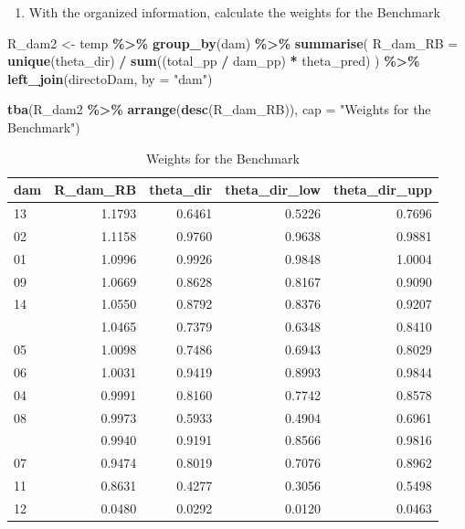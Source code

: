 \documentclass[
  12pt,
]{book}
\newenvironment{Shaded}{\begin{snugshade}}{\end{snugshade}}
\newcommand{\AttributeTok}[1]{\textcolor[rgb]{0.13,0.29,0.53}{#1}}
\newcommand{\FunctionTok}[1]{\textcolor[rgb]{0.13,0.29,0.53}{\textbf{#1}}}
\newcommand{\NormalTok}[1]{#1}
\newcommand{\OtherTok}[1]{\textcolor[rgb]{0.56,0.35,0.01}{#1}}
\newcommand{\SpecialCharTok}[1]{\textcolor[rgb]{0.81,0.36,0.00}{\textbf{#1}}}
\newcommand{\StringTok}[1]{\textcolor[rgb]{0.31,0.60,0.02}{#1}}
\providecommand{\tightlist}{%
  \setlength{\itemsep}{0pt}\setlength{\parskip}{0pt}}
\begin{document}
\begin{enumerate}
\def\labelenumi{\arabic{enumi}.}
\setcounter{enumi}{3}
\tightlist
\item
  With the organized information, calculate the weights for the Benchmark
\end{enumerate}

\begin{Shaded}
\begin{Highlighting}[]
\NormalTok{R\_dam2 }\OtherTok{\textless{}{-}}\NormalTok{ temp }\SpecialCharTok{\%\textgreater{}\%} \FunctionTok{group\_by}\NormalTok{(dam) }\SpecialCharTok{\%\textgreater{}\%} 
  \FunctionTok{summarise}\NormalTok{(}
  \AttributeTok{R\_dam\_RB =} \FunctionTok{unique}\NormalTok{(theta\_dir) }\SpecialCharTok{/} \FunctionTok{sum}\NormalTok{((total\_pp  }\SpecialCharTok{/}\NormalTok{ dam\_pp) }\SpecialCharTok{*}\NormalTok{ theta\_pred)}
\NormalTok{) }\SpecialCharTok{\%\textgreater{}\%}
  \FunctionTok{left\_join}\NormalTok{(directoDam, }\AttributeTok{by =} \StringTok{"dam"}\NormalTok{)}

\FunctionTok{tba}\NormalTok{(R\_dam2 }\SpecialCharTok{\%\textgreater{}\%} \FunctionTok{arrange}\NormalTok{(}\FunctionTok{desc}\NormalTok{(R\_dam\_RB)), }\AttributeTok{cap =} \StringTok{"Weights for the Benchmark"}\NormalTok{)}
\end{Highlighting}
\end{Shaded}

\begin{table}[H]

\caption{\label{tab:unnamed-chunk-21}Weights for the Benchmark}
\centering
\begin{tabular}[t]{lrrrr}
\toprule
dam & R\_dam\_RB & theta\_dir & theta\_dir\_low & theta\_dir\_upp\\
\midrule
13 & 1.1793 & 0.6461 & 0.5226 & 0.7696\\
02 & 1.1158 & 0.9760 & 0.9638 & 0.9881\\
01 & 1.0996 & 0.9926 & 0.9848 & 1.0004\\
09 & 1.0669 & 0.8628 & 0.8167 & 0.9090\\
14 & 1.0550 & 0.8792 & 0.8376 & 0.9207\\
\addlinespace
10 & 1.0465 & 0.7379 & 0.6348 & 0.8410\\
05 & 1.0098 & 0.7486 & 0.6943 & 0.8029\\
06 & 1.0031 & 0.9419 & 0.8993 & 0.9844\\
04 & 0.9991 & 0.8160 & 0.7742 & 0.8578\\
08 & 0.9973 & 0.5933 & 0.4904 & 0.6961\\
\addlinespace
03 & 0.9940 & 0.9191 & 0.8566 & 0.9816\\
07 & 0.9474 & 0.8019 & 0.7076 & 0.8962\\
11 & 0.8631 & 0.4277 & 0.3056 & 0.5498\\
12 & 0.0480 & 0.0292 & 0.0120 & 0.0463\\
\bottomrule
\end{tabular}
\end{table}
\end{document}
